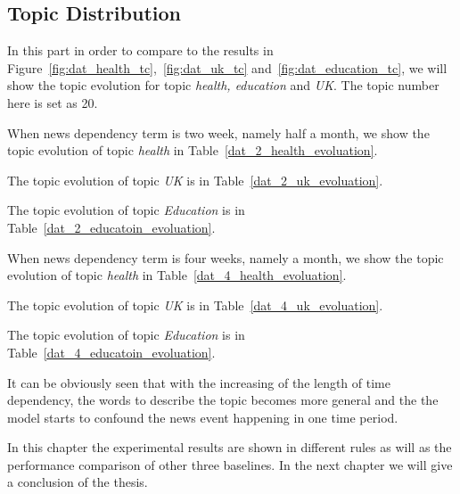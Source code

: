 \subsection{Topic Distribution}
In this part in order to compare to the results in Figure~\ref{fig:dat_health_tc},~\ref{fig:dat_uk_tc} and~\ref{fig:dat_education_tc}, we will show the topic evolution for topic \textit{health, education} and \textit{UK}. The topic number here is set as 20. 

When news dependency term is two week, namely half a month, we show the topic evolution of topic \textit{health} in Table~\ref{dat_2_health_evoluation}.

The topic evolution of topic \textit{UK} is in Table~\ref{dat_2_uk_evoluation}. 

The topic evolution of topic \textit{Education} is in Table~\ref{dat_2_educatoin_evoluation}.

When news dependency term is four weeks, namely a month, we show the topic evolution of topic \textit{health} in Table~\ref{dat_4_health_evoluation}.

The topic evolution of topic \textit{UK} is in Table~\ref{dat_4_uk_evoluation}. 

The topic evolution of topic \textit{Education} is in Table~\ref{dat_4_educatoin_evoluation}.

It can be obviously seen that with the increasing of the length of time dependency, the words to describe the topic becomes more general and the the model starts to confound the news event happening in one time period.

In this chapter the experimental results are shown in different rules as will as the performance comparison of other three baselines. In the next chapter we will give a conclusion of the thesis.

